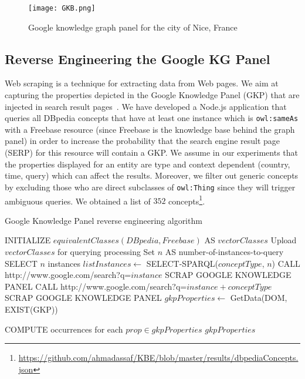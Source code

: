 \begin{wrapfigure}{r}{0.5\textwidth}
  \begin{center}
    \texttt{[image: GKB.png]}
  \end{center}
  \caption{Google knowledge graph panel for the city of Nice, France}
  \label{fig:gkb}
\end{wrapfigure}

\subsection{Reverse Engineering the Google KG Panel}
\label{sec:knowledge-graph}

Web scraping is a technique for extracting data from Web pages. We aim at capturing the properties depicted in the Google Knowledge Panel (GKP) that are injected in search result pages~\cite{Bergman:GKG:12}. We have developed a Node.js application that queries all DBpedia concepts that have at least one instance which is \texttt{owl:sameAs} with a Freebase resource (since Freebase is the knowledge base behind the graph panel) in order to increase the probability that the search engine result page (SERP) for this resource will contain a GKP. We assume in our experiments that the properties displayed for an entity are type and context dependent (country, time, query) which can affect the results. Moreover, we filter out generic concepts by excluding those who are direct subclasses of \texttt{owl:Thing} since they will trigger ambiguous queries. We obtained a list of $352$ concepts\footnote{\url{https://github.com/ahmadassaf/KBE/blob/master/results/dbpediaConcepts.json}}.

\begin{algorithm}[ht]\scriptsize
\caption{Google Knowledge Panel reverse engineering algorithm} \label{algoscrapping}
\begin{algorithmic}[1]
    \STATE INITIALIZE $equivalentClasses(DBpedia,Freebase) $ AS $vectorClasses$
    \STATE Upload $vectorClasses$ for querying processing
    \STATE Set $n$ AS number-of-instances-to-query
	\STATE SELECT $n$ instances
	\STATE $listInstances \leftarrow$ SELECT-SPARQL($conceptType$, $n$)
			\STATE CALL http://www.google.com/search?q=$instance$
				\STATE SCRAP GOOGLE KNOWLEDGE PANEL
			\ELSE
				\STATE CALL http://www.google.com/search?q=$instance + conceptType$
 				\STATE SCRAP GOOGLE KNOWLEDGE PANEL
			\ENDIF
			\STATE $gkpProperties \leftarrow$ GetData(DOM, EXIST(GKP))

		\ENDFOR
	\STATE COMPUTE occurrences for each $prop \in gkpProperties$
    \ENDFOR
    \STATE $gkpProperties$
\end{algorithmic}
\end{algorithm}


